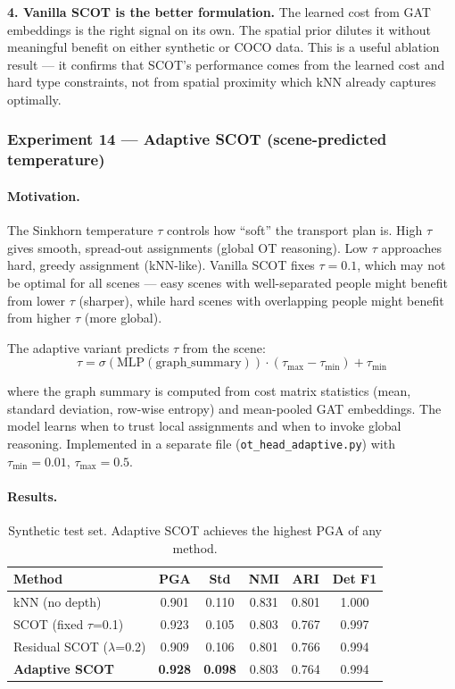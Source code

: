 \textbf{4. Vanilla SCOT is the better formulation.} The learned cost from GAT embeddings is the right signal on its own. The spatial prior dilutes it without meaningful benefit on either synthetic or COCO data. This is a useful ablation result --- it confirms that SCOT's performance comes from the learned cost and hard type constraints, not from spatial proximity which kNN already captures optimally.


\subsubsection{Experiment 14 --- Adaptive SCOT (scene-predicted temperature)}

\paragraph{Motivation.}

The Sinkhorn temperature $\tau$ controls how ``soft'' the transport plan is. High $\tau$ gives smooth, spread-out assignments (global OT reasoning). Low $\tau$ approaches hard, greedy assignment (kNN-like). Vanilla SCOT fixes $\tau = 0.1$, which may not be optimal for all scenes --- easy scenes with well-separated people might benefit from lower $\tau$ (sharper), while hard scenes with overlapping people might benefit from higher $\tau$ (more global).

The adaptive variant predicts $\tau$ from the scene:
\[
\tau = \sigma(\text{MLP}(\text{graph\_summary})) \cdot (\tau_{\max} - \tau_{\min}) + \tau_{\min}
\]

where the graph summary is computed from cost matrix statistics (mean, standard deviation, row-wise entropy) and mean-pooled GAT embeddings. The model learns when to trust local assignments and when to invoke global reasoning. Implemented in a separate file (\texttt{ot\_head\_adaptive.py}) with $\tau_{\min} = 0.01$, $\tau_{\max} = 0.5$.


\paragraph{Results.}

\begin{table}[H]
\centering
\footnotesize
\begin{tabular}{lccccc}
\toprule
Method & PGA & Std & NMI & ARI & Det F1 \\
\midrule
kNN (no depth) & 0.901 & 0.110 & 0.831 & 0.801 & 1.000 \\
SCOT (fixed $\tau$=0.1) & 0.923 & 0.105 & 0.803 & 0.767 & 0.997 \\
Residual SCOT ($\lambda$=0.2) & 0.909 & 0.106 & 0.801 & 0.766 & 0.994 \\
\textbf{Adaptive SCOT} & \textbf{0.928} & \textbf{0.098} & 0.803 & 0.764 & 0.994 \\
\bottomrule
\end{tabular}
\caption{Synthetic test set. Adaptive SCOT achieves the highest PGA of any method.}
\end{table}

